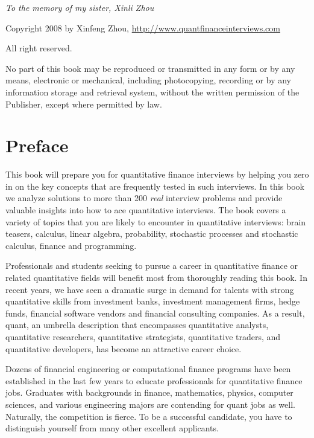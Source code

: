 \begin{center}
\emph{To the memory of my sister, Xinli Zhou}
\end{center}

\textcopyright{}Copyright 2008 by Xinfeng Zhou, \url{http://www.quantfinanceinterviews.com}

All right reserved.

No part of this book may be reproduced or transmitted in any form or by any means,
electronic or mechanical, including photocopying, recording or by any information
storage and retrieval system, without the written permission of the Publisher, except
where permitted by law.

\clearpage
\section*{Preface}

This book will prepare you for quantitative finance interviews by helping you zero in on
the key concepts that are frequently tested in such interviews. In this book we analyze
solutions to more than 200 \emph{real} interview problems and provide valuable insights into
how to ace quantitative interviews. The book covers a variety of topics that you are
likely to encounter in quantitative interviews: brain teasers, calculus, linear algebra,
probability, stochastic processes and stochastic calculus, finance and programming.

Professionals and students seeking to pursue a career in quantitative finance or related
quantitative fields will benefit most from thoroughly reading this book. In recent years,
we have seen a dramatic surge in demand for talents with strong quantitative skills from
investment banks, investment management firms, hedge funds, financial software
vendors and financial consulting companies. As a result, quant, an umbrella description
that encompasses quantitative analysts, quantitative researchers, quantitative strategists,
quantitative traders, and quantitative developers, has become an attractive career choice.

Dozens of financial engineering or computational finance programs have been
established in the last few years to educate professionals for quantitative finance jobs.
Graduates with backgrounds in finance, mathematics, physics, computer sciences, and
various engineering majors are contending for quant jobs as well. Naturally, the
competition is fierce. To be a successful candidate, you have to distinguish yourself
from many other excellent applicants.

